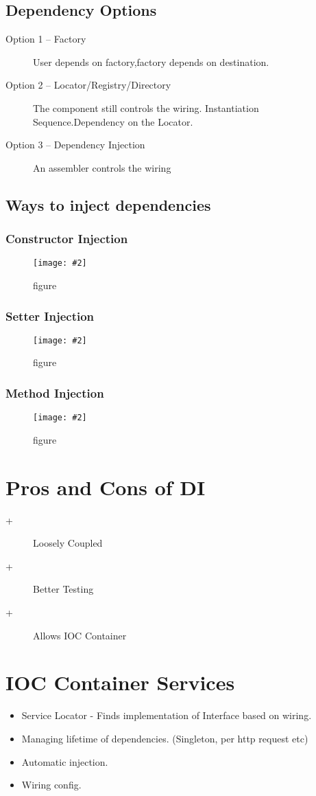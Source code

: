 \documentclass[a4paper,10pt]{scrreprt}
\newcommand{\pic}[2][figure]{\begin{figure}[h]
 \centering
 \texttt{[image: \#2]}
 \caption{#1}
\end{figure}
}
\begin{document}
\subsection{Dependency Options}
\begin{description}

\item [Option 1 – Factory] User depends on factory,factory depends on destination.
\item [Option 2 – Locator/Registry/Directory] The component still controls the wiring. Instantiation 
Sequence.Dependency 
on the Locator.
\item[Option 3 – Dependency Injection] An assembler controls the wiring
\end{description}

\subsection{Ways to inject dependencies}
\subsubsection{Constructor Injection}
\pic{constdi.png}
\subsubsection{Setter Injection}
\pic{setdi.png}
\subsubsection{Method Injection}
\pic{methdi.png}

\section{Pros and Cons of DI}
\begin{description}
 \item [+] Loosely Coupled
 \item [+] Better Testing
 \item [+] Allows IOC Container
\end{description}

\section{IOC Container Services}
\begin{itemize}
 \item Service Locator - Finds implementation of Interface based on wiring.
 \item Managing lifetime of dependencies. (Singleton, per http request etc)
 \item Automatic injection.
 \item Wiring config.
\end{itemize}
\end{document}
